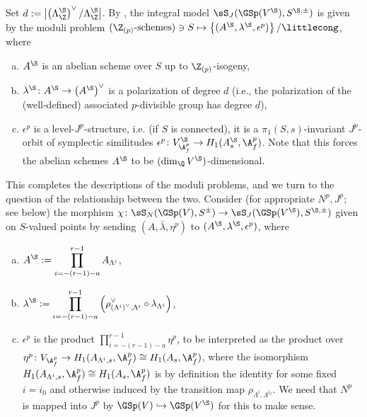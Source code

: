 \documentclass[a4paper]{scrartcl} %
\numberwithin{equation}{section}
\begin{document}
\begin{Remark}\label{paragraph-moduli}
  Set $d:=\bigl|\left(\Lambda_\Z^\S\right)^\vee/\Lambda_\Z^\S\bigr|$.  By \cite[.3, 3.2.4]{kisin}, the integral model $\sS_J(\GSp(V^\S),S^{\S,\pm})$ is given by the moduli problem $(\Z_{(p)}\text{-schemes})\ni S\mapsto \left\{(A^\S,\lambda^\S,\epsilon^p)\right\}/\littlecong$, where
  \begin{enumerate}[(a)]
  \item $A^\S$ is an abelian scheme over $S$ up to $\Z_{(p)}$-isogeny,
  \item $\lambda^\S\colon A^\S\to \left(A^\S\right)^\vee$ is a polarization of degree $d$ (i.e., the polarization of the (well-defined) associated $p$-divisible group has degree $d$),
  \item $\epsilon^p$ is a level-$J^p$-structure, i.e. (if $S$ is connected), it is a $\pi_1(S,s)$-invariant $J^p$-orbit of symplectic similitudes $\epsilon^p\colon V^\S_{\A_f^p}\to H_1(A^\S_s,\A_f^p)$. Note that this forces the abelian schemes $A^\S$ to be $(\dim_\Q V^\S)$-dimensional.
  \end{enumerate}
\end{Remark}

This completes the descriptions of the moduli problems, and we turn to the question of the relationship between the two.  Consider (for appropriate $N^p,J^p$; see below) the morphism $\chi\colon\sS_N(\GSp(V),S^\pm) \to \sS_J(\GSp(V^\S),S^{\S,\pm})$ given on $S$-valued points by sending $(A,\bar\lambda,\eta^p)$ to $(A^\S,\lambda^\S,\epsilon^p)$, where
\begin{enumerate}[(a)]
\item $\displaystyle A^\S:=\prod_{i=-(r-1)-a}^{r-1}A_{\Lambda^i}$,
\item $\displaystyle \lambda^\S:=\prod_{i=-(r-1)-a}^{r-1}\left(\rho_{\left(\Lambda^i\right)^\vee,\Lambda^i}^\vee\circ \lambda_{\Lambda^i}\right)$,
\item $\epsilon^p$ is the product $\prod_{i=-(r-1)-a}^{r-1}\eta^p$, to be interpreted as the product over $\eta^p\colon V_{\A_f^p}\to H_1(A_{\Lambda^i,s},\A_f^p)\cong H_1(A_s,\A_f^p)$, where the isomorphism $H_1(A_{\Lambda^i,s},\A_f^p)\cong H_1(A_s,\A_f^p)$ is by definition the identity for some fixed $i=i_0$ and otherwise induced by the transition map $\rho_{\Lambda^{i},\Lambda^{i_0}}$. We need that $N^p$ is mapped into $J^p$ by $\GSp(V)\hookrightarrow\GSp(V^\S)$ for this to make sense.
\end{enumerate}
\end{document}
